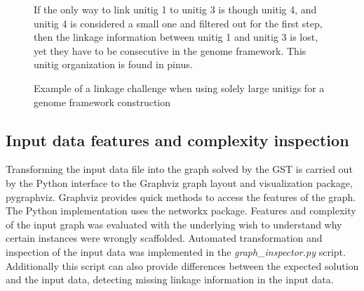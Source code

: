 \documentclass[12pt]{article}
\begin{document}
\begin{figure}[h!]
\begin{center}
\end{center}
\caption{Example of a linkage challenge when using solely large unitigs for a genome framework construction}
{\footnotesize If the only way to link unitig 1 to unitig 3 is though unitig 4, and unitig 4 is considered a small one and filtered out for the first step, then the linkage information between unitig 1 and unitig 3 is lost, yet they have to be consecutive in the genome framework. This unitig organization is found in pinus.}
\label{fig:flowlinkage}
\end{figure}


\subsection{Input data features and complexity inspection}
Transforming the input data file into the graph solved by the GST is carried out by the Python interface to the Graphviz \cite{gansner_open_2000,ellson_graphviz_2003} graph layout and visualization package, pygraphviz. Graphviz provides quick methods to access the features of the graph. The Python implementation uses the networkx \cite{hagberg-2008-exploring} package. Features and complexity of the input graph was evaluated with the underlying wish to understand why certain instances were wrongly scaffolded. Automated transformation and inspection of the input data was implemented in the \textit{graph\_inspector.py} script. Additionally this script can also provide differences between the expected solution and the input data, detecting missing linkage information in the input data.
\end{document}
